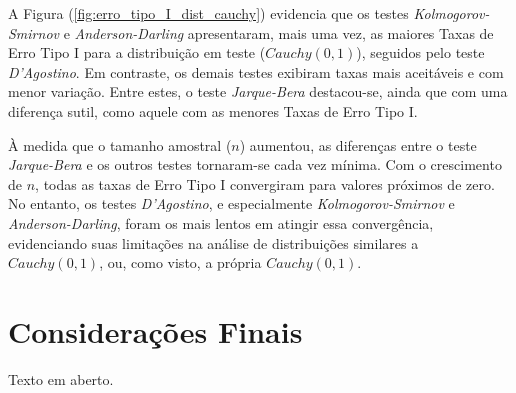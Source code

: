 \documentclass[a4paper,11pt]{article} %
\begin{document}
\vspace{0.5cm}

A Figura (\ref{fig:erro_tipo_I_dist_cauchy}) evidencia que os testes \textit{Kolmogorov-Smirnov} e \textit{Anderson-Darling} apresentaram, mais uma vez, as maiores Taxas de Erro Tipo I para a distribuição em teste ($Cauchy(0, 1)$), seguidos pelo teste \textit{D'Agostino}. Em contraste, os demais testes exibiram taxas mais aceitáveis e com menor variação. Entre estes, o teste \textit{Jarque-Bera} destacou-se, ainda que com uma diferença sutil, como aquele com as menores Taxas de Erro Tipo I.

À medida que o tamanho amostral ($n$) aumentou, as diferenças entre o teste \textit{Jarque-Bera} e os outros testes tornaram-se cada vez mínima. Com o crescimento de $n$, todas as taxas de Erro Tipo I convergiram para valores próximos de zero. No entanto, os testes \textit{D'Agostino}, e especialmente \textit{Kolmogorov-Smirnov} e \textit{Anderson-Darling}, foram os mais lentos em atingir essa convergência, evidenciando suas limitações na análise de distribuições similares a $Cauchy(0, 1)$, ou, como visto, a própria  $Cauchy(0, 1)$.

\vspace{0.5cm}



\section{Considerações Finais}

Texto em aberto.
\end{document}
